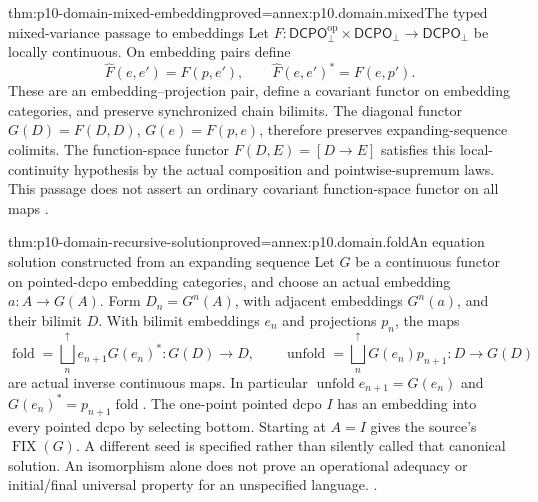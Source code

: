 \begin{hbtheorem}{thm:p10-domain-mixed-embedding}{proved=annex:p10.domain.mixed}{The typed mixed-variance passage to embeddings}
Let \(F:\mathsf{DCPO}_{\bot}^{\mathrm{op}}\times
\mathsf{DCPO}_{\bot}\to\mathsf{DCPO}_{\bot}\) be locally
continuous. On embedding pairs define
\[
 \widehat F(e,e')=F(p,e'),\qquad
                   \widehat F(e,e')^*=F(e,p').
\]
These are an embedding--projection pair, define a covariant functor
on embedding categories, and preserve synchronized chain bilimits.
The diagonal functor \(G(D)=F(D,D)\),
\(G(e)=F(p,e)\), therefore preserves expanding-sequence colimits.
The function-space functor \(F(D,E)=[D\longrightarrow E]\)
satisfies this local-continuity hypothesis by the actual composition
and pointwise-supremum laws. This passage does not assert an
ordinary covariant function-space functor on all maps
\cite[Proposition~5.2.6, pp.~72--73]
{AbramskyJungCorrectedExpandedDomainTheory}.
\end{hbtheorem}

\begin{hbtheorem}{thm:p10-domain-recursive-solution}{proved=annex:p10.domain.fold}{An equation solution constructed from an expanding sequence}
Let \(G\) be a continuous functor on pointed-dcpo embedding
categories, and choose an actual embedding \(a:A\to G(A)\).
Form \(D_n=G^n(A)\), with adjacent embeddings \(G^n(a)\),
and their bilimit \(D\). With bilimit embeddings \(e_n\) and
projections \(p_n\), the maps
\[
 \operatorname{fold}=\bigsqcup_n^{\uparrow}e_{n+1}G(e_n)^*:G(D)\to D,
 \qquad
 \operatorname{unfold}=\bigsqcup_n^{\uparrow}G(e_n)p_{n+1}:D\to G(D)
\]
are actual inverse continuous maps. In particular
\(\operatorname{unfold}e_{n+1}=G(e_n)\) and
\(G(e_n)^*=p_{n+1}\operatorname{fold}\).
The one-point pointed dcpo \(I\) has an embedding into every
pointed dcpo by selecting bottom. Starting at \(A=I\) gives
the source's \(\operatorname{FIX}(G)\). A different seed is
specified rather than silently called that canonical solution.
An isomorphism alone does not prove an operational adequacy or
initial/final universal property for an unspecified language.
\cite[Lemma~5.2.2, pp.~70--71]{AbramskyJungCorrectedExpandedDomainTheory}.
\end{hbtheorem}

